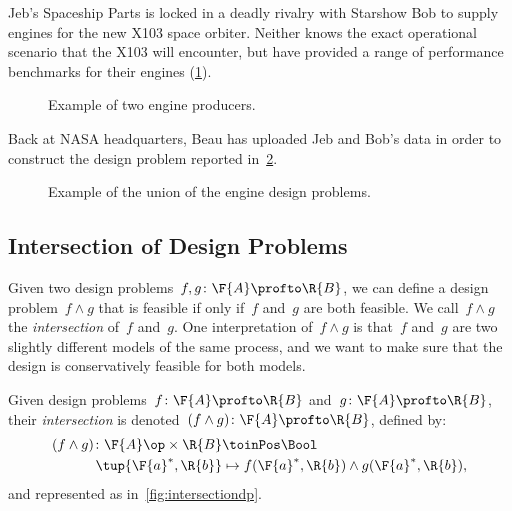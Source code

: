 \begin{example}
    Jeb's Spaceship Parts is locked in a deadly rivalry with Starshow Bob to supply engines for the new X103 space orbiter. Neither knows the exact operational scenario that the X103 will encounter, but have provided a range of performance benchmarks for their engines (\cref{fig:exunion_1}).
    \begin{figure}[h!]
        \begin{center}
        \end{center}
        \caption{Example of two engine producers. \label{fig:exunion_1}}
    \end{figure}
    Back at NASA headquarters, Beau has uploaded Jeb and Bob's data in order to construct the design problem reported in~\cref{fig:exunion_2}.
    \begin{figure}[h!]
        \begin{center}
        \end{center}
        \caption{Example of the union of the engine design problems. \label{fig:exunion_2}}
    \end{figure}
\end{example}

\subsection{Intersection of Design Problems}

Given two design problems~$f, g \colon \F{A} \profto \R{B}$, we can define a design problem~$f \wedge g$ that is feasible if only if~$f$ and~$g$ are both feasible. We call~$f \wedge g$ the \emph{intersection} of~$f$ and~$g$. One interpretation of~$f \wedge g$ is that~$f$ and~$g$ are two slightly different models of the same process, and we want to make sure that the design is conservatively feasible for both models.

\begin{definition}
    \label{def:dp-intersection}
    Given design problems~$f\colon \F{A} \profto \R{B}$ and~$g\colon \F{A} \profto \R{B}$,
    their \emph{intersection} is denoted~$(f \wedge g)\colon \F{A} \profto \R{B}$, defined by:
    \begin{equation}
        \begin{aligned}
        (f \wedge g)
            \colon \F{A}\op \times \R{B} & \toinPos \Bool \\
            \tup{\F{a}^*, \R{b}} & \mapsto f(\F{a}^*, \R{b}) \wedge  g(\F{a}^*, \R{b}),
        \end{aligned}
    \end{equation}
    and represented as in~\cref{fig:intersectiondp}.
\end{definition}

